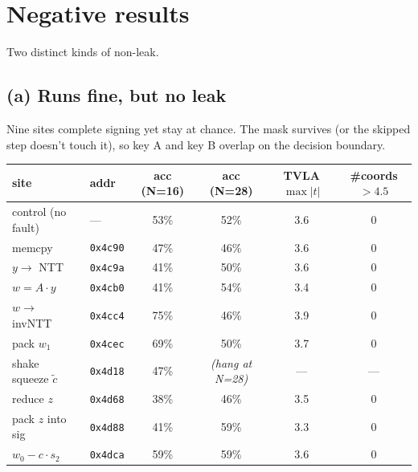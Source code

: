 \documentclass[11pt]{article}
\newcommand{\tabst}{|t|}
\newcommand{\code}[1]{\texttt{#1}}
\begin{document}
\section{Negative results}

Two distinct kinds of non-leak.

\subsection{(a) Runs fine, but no leak}

Nine sites complete signing yet stay at chance. The mask survives (or the
skipped step doesn't touch it), so key A and key B overlap on the decision
boundary.

\begin{table}[h]
\centering
\begin{tabular}{@{}llcccc@{}}
\toprule
site & addr & acc (N=16) & acc (N=28) & TVLA $\max\tabst$ & \#coords $>4.5$ \\
\midrule
control (no fault) & --- & 53\% & 52\% & 3.6 & 0 \\
memcpy & \code{0x4c90} & 47\% & 46\% & 3.6 & 0 \\
$y \to$ NTT & \code{0x4c9a} & 41\% & 50\% & 3.6 & 0 \\
$w = A\cdot y$ & \code{0x4cb0} & 41\% & 54\% & 3.4 & 0 \\
$w \to$ invNTT & \code{0x4cc4} & 75\% & 46\% & 3.9 & 0 \\
pack $w_1$ & \code{0x4cec} & 69\% & 50\% & 3.7 & 0 \\
shake squeeze $\tilde{c}$ & \code{0x4d18} & 47\% & \emph{(hang at N=28)} & --- & --- \\
reduce $z$ & \code{0x4d68} & 38\% & 46\% & 3.5 & 0 \\
pack $z$ into sig & \code{0x4d88} & 41\% & 59\% & 3.3 & 0 \\
$w_0 - c\cdot s_2$ & \code{0x4dca} & 59\% & 59\% & 3.6 & 0 \\
\bottomrule
\end{tabular}
\end{table}

\end{document}
